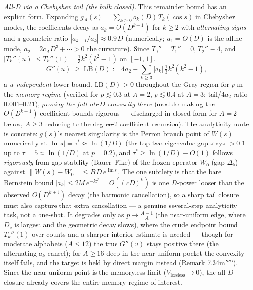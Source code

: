 \documentclass[
]{article}
\begin{document}
\emph{All-$D$ via a Chebyshev tail (the bulk closed).} This remainder bound has
an explicit form. Expanding $g_A(s)=\sum_{k\ge0}a_k(D)\,T_k(\cos s)$ in
Chebyshev modes, the coefficients decay as $a_k=O(D^{k+1})$ for $k\ge2$ with
\emph{alternating signs} and a geometric ratio $|a_{k+1}/a_k|\approx0.9\,D$
(numerically; $a_1=O(D)$ is the affine mode, $a_2=2c_A D^3+\cdots>0$ the
curvature). Since $T_0''=T_1''=0$, $T_2''\equiv4$, and $|T_k''(u)|\le
T_k''(1)=\tfrac13 k^2(k^2-1)$ on $[-1,1]$,
\[
  G''(u)\;\ge\;\mathrm{LB}(D):=4a_2-\sum_{k\ge3}|a_k|\,\tfrac13 k^2(k^2-1),
\]
a \emph{$u$-independent} lower bound. $\mathrm{LB}(D)>0$ throughout the Gray
region for $p$ in the \emph{memory regime} (verified for $p\lesssim0.3$ at $A=2$,
$p\lesssim0.4$ at $A=3$; tail/$4a_2$ ratio $0.001$--$0.21$), \emph{proving the
full all-$D$ convexity there} (modulo making the $O(D^{k+1})$ coefficient bounds
rigorous --- discharged in closed form for $A=2$ below, $A\ge3$ reducing to the
degree-2 coefficient recursion). The analyticity route is concrete: $g(s)$'s nearest singularity is the
Perron branch point of $W(s)$, numerically at $|\mathrm{Im}\,s|=\tau^*\approx
\ln(1/D)$ (the top-two eigenvalue gap stays $>0.1$ up to $\tau=5\approx\ln(1/D)$
at $p=0.2$), and $\tau^*\ge\ln(1/D)-O(1)$ follows \emph{rigorously} from
gap-stability (Bauer--Fike) of the frozen operator $W_0$ (gap $\Delta_0$) against
$\|W(s)-W_0\|\le B\,D\,e^{|\mathrm{Im}\,s|}$. The one subtlety is that the bare
Bernstein bound $|a_k|\le2M\,e^{-k\tau^*}=O((cD)^k)$ is one $D$-power looser than
the observed $O(D^{k+1})$ decay (the harmonic cancellation), so a sharp tail
closure must also capture that extra cancellation --- a genuine
several-step analyticity task, not a one-shot. It
degrades only as $p\to\tfrac{A-1}{A}$ (the near-uniform edge, where $D_c$ is
largest and the geometric decay slows), where the crude endpoint bound
$T_k''(1)$ over-counts and a sharper interior estimate is needed --- though for moderate alphabets ($A\le12$) the true $G''(u)$ stays positive
there (the alternating $a_k$ cancel); for $A\ge16$ deep in the near-uniform
pocket the convexity itself fails, and the target is held by direct margin
instead (Remark 7.34m$'''''$). Since the
near-uniform point is the memoryless limit ($V_{\mathrm{lossless}}\to0$), the
all-$D$ closure already covers the entire memory regime of interest.
\end{document}
